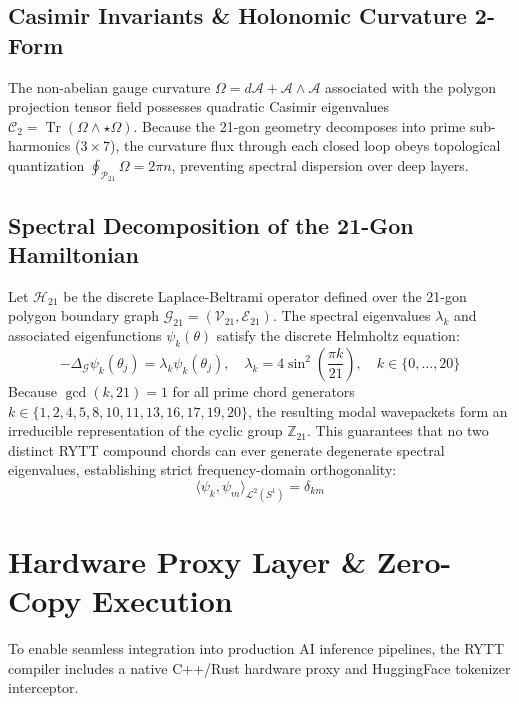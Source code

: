 \documentclass[11pt,oneside,letterpaper]{article}
\theoremstyle{definition}
\begin{document}
\subsection{Casimir Invariants \& Holonomic Curvature 2-Form}
The non-abelian gauge curvature $\Omega = d\mathcal{A} + \mathcal{A} \wedge \mathcal{A}$ associated with the polygon projection tensor field possesses quadratic Casimir eigenvalues $\mathcal{C}_2 = \operatorname{Tr}(\Omega \wedge \star \Omega)$. Because the 21-gon geometry decomposes into prime sub-harmonics ($3 \times 7$), the curvature flux through each closed loop obeys topological quantization $\oint_{\mathcal{P}_{21}} \Omega = 2\pi n$, preventing spectral dispersion over deep layers.

\subsection{Spectral Decomposition of the 21-Gon Hamiltonian}
Let $\mathcal{H}_{21}$ be the discrete Laplace-Beltrami operator defined over the 21-gon polygon boundary graph $\mathcal{G}_{21} = (\mathcal{V}_{21}, \mathcal{E}_{21})$. The spectral eigenvalues $\lambda_k$ and associated eigenfunctions $\psi_k(\theta)$ satisfy the discrete Helmholtz equation:
\begin{equation}
-\Delta_{\mathcal{G}} \psi_k(\theta_j) = \lambda_k \psi_k(\theta_j), \quad \lambda_k = 4 \sin^2\left(\frac{\pi k}{21}\right), \quad k \in \{0, \dots, 20\}
\end{equation}
Because $\gcd(k, 21) = 1$ for all prime chord generators $k \in \{1, 2, 4, 5, 8, 10, 11, 13, 16, 17, 19, 20\}$, the resulting modal wavepackets form an irreducible representation of the cyclic group $\mathbb{Z}_{21}$. This guarantees that no two distinct RYTT compound chords can ever generate degenerate spectral eigenvalues, establishing strict frequency-domain orthogonality:
\begin{equation}
\langle \psi_k, \psi_m \rangle_{\mathcal{L}^2(S^1)} = \delta_{km}
\end{equation}

\section{Hardware Proxy Layer \& Zero-Copy Execution}

To enable seamless integration into production AI inference pipelines, the RYTT compiler includes a native C++/Rust hardware proxy and HuggingFace tokenizer interceptor.
\end{document}
